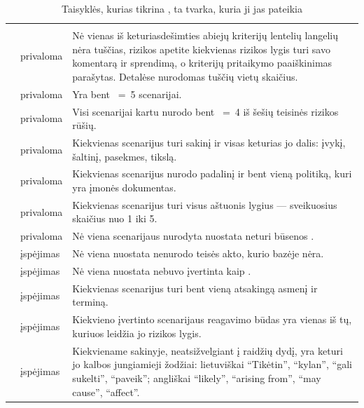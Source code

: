 \begin{xltabular}{\textwidth}{@{}L{37mm}L{17mm}Y@{}}
\caption{Taisyklės, kurias tikrina , ta tvarka, kuria ji jas pateikia}\label{tab:programme:riskrules}\\
\toprule
{} &  &  \\
\midrule
\endfirsthead
\toprule
{} &  &  \\
\midrule
\endhead
\bottomrule
\endlastfoot
{} & privaloma & Nė vienas iš keturiasdešimties abiejų kriterijų lentelių langelių nėra tuščias, rizikos apetite kiekvienas rizikos lygis turi savo komentarą ir sprendimą, o kriterijų pritaikymo paaiškinimas parašytas. Detalėse nurodomas tuščių vietų skaičius. \\
 & privaloma & Yra bent ~=~5 scenarijai. \\
 & privaloma & Visi scenarijai kartu nurodo bent ~=~4 iš šešių teisinės rizikos rūšių. \\
 & privaloma & Kiekvienas scenarijus turi sakinį ir visas keturias jo dalis: įvykį, šaltinį, pasekmes, tikslą. \\
 & privaloma & Kiekvienas scenarijus nurodo padalinį ir bent vieną politiką, kuri yra įmonės dokumentas. \\
 & privaloma & Kiekvienas scenarijus turi visus aštuonis lygius --- sveikuosius skaičius nuo 1 iki 5. \\
 & privaloma & Nė viena scenarijaus nurodyta nuostata neturi būsenos . \\
 & įspėjimas & Nė viena nuostata nenurodo teisės akto, kurio bazėje nėra. \\
 & įspėjimas & Nė viena nuostata nebuvo įvertinta kaip . \\
 & įspėjimas & Kiekvienas scenarijus turi bent vieną atsakingą asmenį ir terminą. \\
 & įspėjimas & Kiekvieno įvertinto scenarijaus reagavimo būdas yra vienas iš tų, kuriuos leidžia jo rizikos lygis. \\
 & įspėjimas & Kiekviename sakinyje, neatsižvelgiant į raidžių dydį, yra keturi jo kalbos jungiamieji žodžiai: lietuviškai \enquote{Tikėtin}, \enquote{kylan}, \enquote{gali sukelti}, \enquote{paveik}; angliškai \enquote{likely}, \enquote{arising from}, \enquote{may cause}, \enquote{affect}. \\
\end{xltabular}

